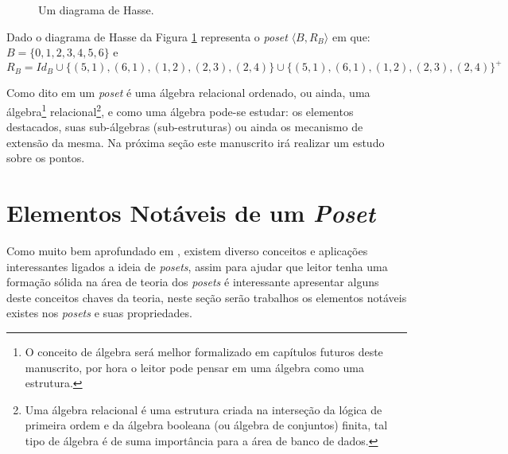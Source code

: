 \begin{figure}[h]
  \centering
  \caption{Um diagrama de Hasse.}
  \label{fig:DiagramaHasse6}
\end{figure}

\begin{exemplo}
  Dado o diagrama de Hasse da Figura \ref{fig:DiagramaHasse6} representa o \textit{poset} $\langle B, R_B \rangle$ em que: $B = \{0, 1, 2, 3, 4, 5, 6\}$ e 
  $$R_B = Id_B \cup \{(5, 1), (6, 1), (1, 2), (2, 3), (2, 4)\} \cup  \{(5, 1), (6, 1), (1, 2), (2, 3), (2, 4)\}^+$$
\end{exemplo}

Como dito em \cite{carmo2013} um \textit{poset} é uma álgebra relacional ordenado, ou ainda, uma álgebra\footnote{O conceito de álgebra será melhor formalizado em capítulos futuros deste manuscrito, por hora o leitor pode pensar em uma álgebra como uma estrutura.} relacional\footnote{Uma álgebra relacional é uma estrutura criada na interseção da lógica de primeira ordem e da álgebra booleana (ou álgebra de conjuntos) finita, tal tipo de álgebra é de suma importância para a área de banco de dados.}, e como uma álgebra pode-se estudar: os elementos destacados, suas sub-álgebras (sub-estruturas) ou ainda os mecanismo de extensão da mesma. Na próxima seção este manuscrito irá realizar um estudo sobre os pontos.

\section{Elementos Notáveis de um \textit{Poset}}\label{sec:ElementosNotaveisPoset}

Como muito bem aprofundado em \cite{carmo2013, morgado1962poset, neggers1998poset}, existem diverso conceitos e aplicações interessantes ligados a ideia de \textit{posets}, assim para ajudar que leitor tenha uma formação sólida na área de teoria dos \textit{posets} é interessante apresentar alguns deste conceitos chaves da teoria, neste seção serão trabalhos os elementos notáveis existes nos \textit{posets} e suas propriedades.

